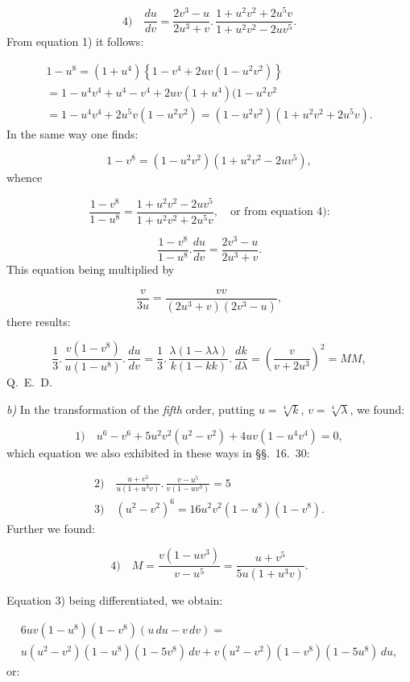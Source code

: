 \documentclass{article}
\begin{document}
\[
\text{4)}\quad\frac{du}{dv}=\frac{2v^{3}-u}{2u^{3}+v}.\,\frac{1+u^{2}v^{2}+2u^{5}v}{1+u^{2}v^{2}-2uv^{5}}.
\]
From equation 1) it follows:

\[
\begin{gathered}
1-u^{8}=(1+u^{4})\left\{1-v^{4}+2uv(1-u^{2}v^{2})\right\}\\[1ex]
=1-u^{4}v^{4}+u^{4}-v^{4}+2uv(1+u^{4})(1-u^{2}v^{2}\\[1ex]
=1-u^{4}v^{4}+2u^{5}v(1-u^{2}v^{2})=(1-u^{2}v^{2})(1+u^{2}v^{2}+2u^{5}v).
\end{gathered}
\]
In the same way one finds:

\[
1-v^{8}=(1-u^{2}v^{2})(1+u^{2}v^{2}-2uv^{5}),
\]
whence

\[
\frac{1-v^{8}}{1-u^{8}}=\frac{1+u^{2}v^{2}-2uv^{5}}{1+u^{2}v^{2}+2u^{5}v},\quad\text{or from equation 4):}
\]

\[
\frac{1-v^{8}}{1-u^{8}}.\frac{du}{dv}=\frac{2v^{3}-u}{2u^{3}+v}.
\]
This equation being multiplied by

\[
\frac{v}{3u}=\frac{vv}{(2u^{3}+v)(2v^{3}-u)},
\]
there results:

\[
\frac{1}{3}.\,\frac{v(1-v^{8})}{u(1-u^{8})}.\,\frac{du}{dv}=\frac{1}{3}.\,\frac{\lambda(1-\lambda\lambda)}{k(1-kk)}.\,\frac{dk}{d\lambda}=\left(\frac{v}{v+2u^{3}}\right)^{2}=MM,
\]
Q.\ E.\ D.

\emph{b)} In the transformation of the \emph{fifth} order, putting $u=\sqrt[4]{k}$, $v=\sqrt[4]{\lambda}$, we found:

\[
\text{1)}\quad u^{6}-v^{6}+5u^{2}v^{2}(u^{2}-v^{2})+4uv(1-u^{4}v^{4})=0,
\]
which equation we also exhibited in these ways in §§.\ 16.\ 30:

\[
\begin{gathered}
\text{2)}\quad\frac{u+v^{5}}{u(1+u^{3}v)}.\,\frac{v-u^{5}}{v(1-uv^{3})}=5\\[1.5ex]
\text{3)}\quad(u^{2}-v^{2})^{6}=16u^{2}v^{2}(1-u^{8})(1-v^{8}).
\end{gathered}
\]
Further we found:

\[
\text{4)}\quad M=\frac{v(1-uv^{3})}{v-u^{5}}=\frac{u+v^{5}}{5u(1+u^{3}v)}.
\]

Equation 3) being differentiated, we obtain:

\[
\begin{gathered}
6uv(1-u^{8})(1-v^{8})(u\,du-v\,dv)=\\[1ex]
u(u^{2}-v^{2})(1-u^{8})(1-5v^{8})\,dv+v(u^{2}-v^{2})(1-v^{8})(1-5u^{8})\,du,
\end{gathered}
\]
or:
\end{document}
